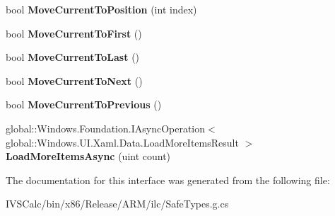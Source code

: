 \begin{DoxyCompactItemize}
\item 
\mbox{\label{interface_windows_1_1_u_i_1_1_xaml_1_1_data_1_1_i_collection_view_ae88f3d07181d3a6e208afb6bda974829}} 
bool {\bfseries Move\+Current\+To\+Position} (int index)
\item 
\mbox{\label{interface_windows_1_1_u_i_1_1_xaml_1_1_data_1_1_i_collection_view_ad33f946fe8c227113abf86382ef89863}} 
bool {\bfseries Move\+Current\+To\+First} ()
\item 
\mbox{\label{interface_windows_1_1_u_i_1_1_xaml_1_1_data_1_1_i_collection_view_ae65c293d74c8ea11c12e336ac356a09b}} 
bool {\bfseries Move\+Current\+To\+Last} ()
\item 
\mbox{\label{interface_windows_1_1_u_i_1_1_xaml_1_1_data_1_1_i_collection_view_a610b679e23844c41db0d4efbc636d544}} 
bool {\bfseries Move\+Current\+To\+Next} ()
\item 
\mbox{\label{interface_windows_1_1_u_i_1_1_xaml_1_1_data_1_1_i_collection_view_a2760c561a55591665e6f3b806911c9f5}} 
bool {\bfseries Move\+Current\+To\+Previous} ()
\item 
\mbox{\label{interface_windows_1_1_u_i_1_1_xaml_1_1_data_1_1_i_collection_view_afff3ada80e1e28eecc211ceea07432e6}} 
global\+::\+Windows.\+Foundation.\+I\+Async\+Operation$<$ global\+::\+Windows.\+U\+I.\+Xaml.\+Data.\+Load\+More\+Items\+Result $>$ {\bfseries Load\+More\+Items\+Async} (uint count)
\end{DoxyCompactItemize}


The documentation for this interface was generated from the following file\+:\begin{DoxyCompactItemize}
\item 
I\+V\+S\+Calc/bin/x86/\+Release/\+A\+R\+M/ilc/Safe\+Types.\+g.\+cs\end{DoxyCompactItemize}
